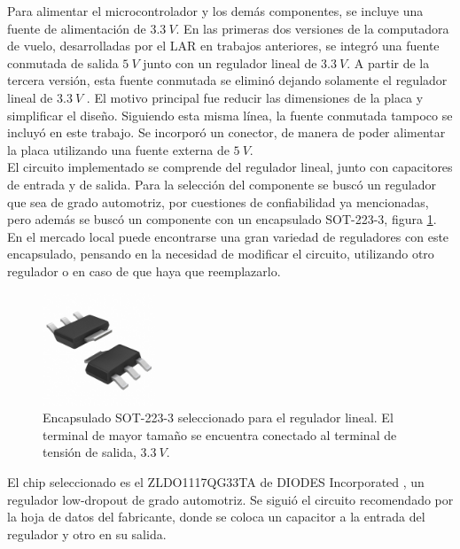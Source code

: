 Para alimentar el microcontrolador y los demás componentes, se incluye una fuente de alimentación de $3.3 \ V$. En las primeras dos versiones de la computadora de vuelo, desarrolladas por el LAR en trabajos anteriores, se integró una fuente conmutada de salida $5 \ V$ junto con un regulador lineal de $3.3 \ V$. A partir de la tercera versión, esta fuente conmutada se eliminó dejando solamente el regulador lineal de $3.3 \ V$ \cite{garberoglio2019diseno}. El motivo principal fue reducir las dimensiones de la placa y simplificar el diseño. Siguiendo esta misma línea, la fuente conmutada tampoco se incluyó en este trabajo. Se incorporó un conector, de manera de poder alimentar la placa utilizando una fuente externa de $5 \ V$.\\

El circuito implementado se comprende del regulador lineal, junto con capacitores de entrada y de salida. Para la selección del componente se buscó un regulador que sea de grado automotriz, por cuestiones de confiabilidad ya mencionadas, pero además se buscó un componente con un encapsulado SOT-223-3, figura \ref{fig:sot_223_3}. En el mercado local puede encontrarse una gran variedad de reguladores con este encapsulado, pensando en la necesidad de modificar el circuito, utilizando otro regulador o en caso de que haya que reemplazarlo.\\

\begin{figure}[H]
    \centering
    \includegraphics[width=0.3\textwidth]{img/sot_223_3.png}
    \caption{Encapsulado SOT-223-3 seleccionado para el regulador lineal. El terminal de mayor tamaño se encuentra conectado al terminal de tensión de salida, $3.3 \ V$.}
    \label{fig:sot_223_3}
\end{figure}

El chip seleccionado es el ZLDO1117QG33TA de DIODES Incorporated \cite{ZLDO1117QG33TA}, un regulador low-dropout de grado automotriz. Se siguió el circuito recomendado por la hoja de datos del fabricante, donde se coloca un capacitor a la entrada del regulador y otro en su salida.\\

